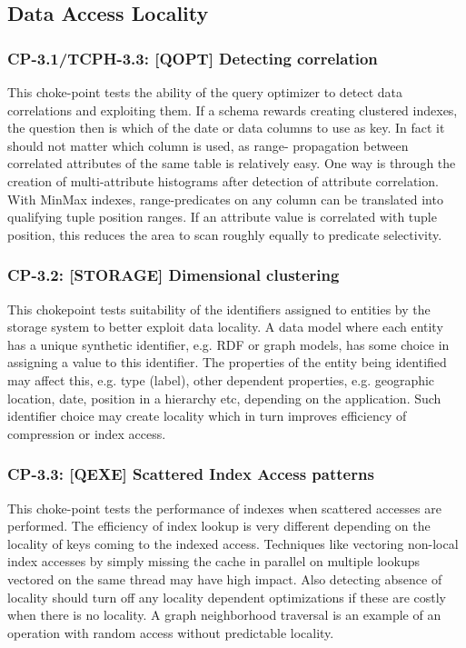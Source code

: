 \subsection{Data Access Locality}

\subsubsection{CP-3.1/TCPH-3.3: [QOPT]  Detecting correlation}
\label{choke_point_3.1}
This choke-point tests the ability of the query optimizer to detect data correlations and exploiting them. If a schema rewards creating clustered indexes, the question then is which of the date or data columns to use as key.
In fact it should not matter which column is used, as range- propagation between correlated attributes of the same table is relatively easy. One way is through the creation of multi-attribute histograms after detection of attribute correlation.
With MinMax indexes, range-predicates on any column can be translated into qualifying tuple position ranges. If an attribute value is correlated with tuple position, this reduces the area to scan roughly equally to predicate selectivity.

\subsubsection{CP-3.2: [STORAGE] Dimensional clustering}
\label{choke_point_3.2}
This chokepoint tests suitability of the identifiers assigned to entities by the storage system to better exploit data locality. A data model where each entity has a unique synthetic identifier,
e.g. RDF or graph models, has some choice in assigning a value to this identifier. The properties of the entity being identified may affect this, e.g. type (label), other dependent properties,
e.g. geographic location, date, position in a hierarchy etc, depending on the application. Such identifier choice may create locality which in turn improves efficiency of compression or index access.

\subsubsection{CP-3.3: [QEXE] Scattered Index Access patterns}
\label{choke_point_3.3}
This choke-point tests the performance of indexes when scattered accesses are performed. The efficiency of index lookup is very different depending on the locality of keys coming to the indexed access.
Techniques like vectoring non-local index accesses by simply missing the cache in parallel on multiple lookups vectored on the same thread may have high impact.
Also detecting absence of locality should turn off any locality dependent optimizations if these are costly when there is no locality. A graph neighborhood traversal is an example of an operation with random access without predictable locality.

